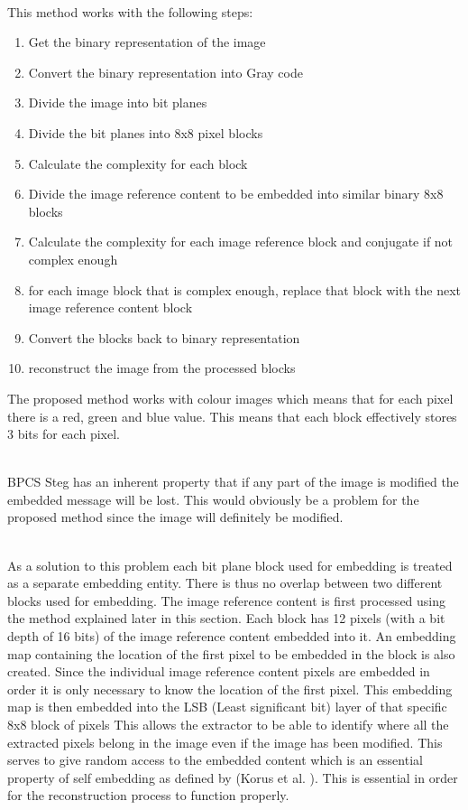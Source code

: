 \documentclass[12pt]{article}
\begin{document}
\hspace{0pt} \\
This method works with the following steps:
\begin{enumerate}
  \item Get the binary representation of the image
  \item Convert the binary representation into Gray code
  \item Divide the image into bit planes
  \item Divide the bit planes into 8x8 pixel blocks
  \item Calculate the complexity for each block
  \item Divide the image reference content to be embedded into similar binary 8x8 blocks
  \item Calculate the complexity for each image reference block and conjugate if not complex enough
  \item for each image block that is complex enough, replace that block with the next image reference content block
  \item Convert the blocks back to binary representation
  \item reconstruct the image from the processed blocks 
\end{enumerate}
The proposed method works with colour images which means that for each pixel there is a red, green and blue value. This means that each block effectively stores 3 bits for each pixel. 

\hspace{0pt} \\
BPCS Steg has an inherent property that if any part of the image is modified the embedded message will be lost.
This would obviously be a problem for the proposed method since the image will definitely be modified.

\hspace{0pt} \\
As a solution to this problem each bit plane block used for embedding is treated as a separate embedding entity.
There is thus no overlap between two different blocks used for embedding.
The image reference content is first processed using the method explained later in this section.
Each block has 12 pixels (with a bit depth of 16 bits) of the image reference content embedded into it.
An embedding map containing the location of the first pixel to be embedded in the block is also created.
Since the individual image reference content pixels are embedded in order it is only necessary to know the location of the first pixel.
This embedding map is then embedded into the LSB (Least significant bit) layer of that specific 8x8 block of pixels 
This allows the extractor to be able to identify where all the extracted pixels belong in the image even if the image has been modified.
This serves to give random access to the embedded content which is an essential property of self embedding as defined by (Korus et al. \cite{korus2013efficient}).
This is essential in order for the reconstruction process to function properly.
\end{document}
